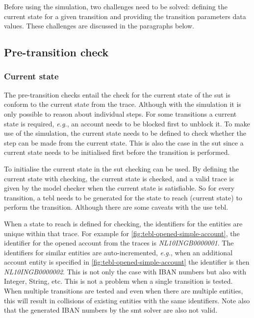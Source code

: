 Before using the simulation, two challenges need to be solved: defining the
current state for a given transition and providing the transition parameters
data values. These challenges are discussed in the paragraphs below.

\subsection{Pre-transition check}

\subsubsection*{Current state}\label{sec:ch5-current-state}

The pre-transition checks entail the check for the current state of the \gls{sut} is
conform to the current state from the trace. Although with the simulation it is
only possible to reason about individual steps. For some transitions a current
state is required, \textit{e.g.}, an account needs to be blocked first to
unblock it. To make use of the simulation, the current state needs to be defined
to check whether the step can be made from the current state. This is also the
case in the \gls{sut} since a current state needs to be initialised first before the
transition is performed.

To initialise the current state in the \gls{sut} checking can be used. By defining
the current state with checking, the current state is checked, and a valid trace
is given by the model checker when the current state is satisfiable. So for
every transition, a tebl needs to be generated for the state to reach
(current state) to perform the transition. Although there are some caveats with
the use tebl.

When a state to reach is defined for checking, the identifiers for the entities
are unique within that trace. For example for
\autoref{fig:tebl-opened-simple-account}, the identifier for the opened account
from the traces is \textit{NL10INGB0000001}. The identifiers for similar
entities are auto-incremented, \textit{e.g.}, when an additional account entity
is specified in \autoref{fig:tebl-opened-simple-account} the identifier is then
\textit{NL10INGB0000002}. This is not only the case with IBAN numbers but also
with Integer, String, etc. This is not a problem when a single transition is
tested. When multiple transitions are tested and even when there are multiple
entities, this will result in collisions of existing entities with the same
identifiers. Note also that the generated IBAN numbers by the \gls{smt} solver are
also not valid.

